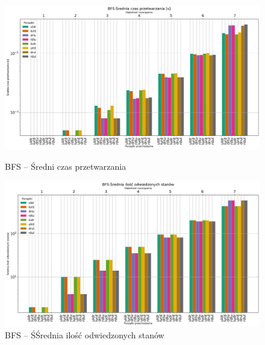 \documentclass{classrep}
\begin{document}
\begin{figure}[H]
    \includegraphics[width=\textwidth]{charts/BFS_time.png}
    \caption{BFS -- Średni czas przetwarzania}
    \label{BFS:time}
    \includegraphics[width=\textwidth]{charts/BFS_visited.png}
    \caption{BFS -- ŚŚrednia ilość odwiedzonych stanów}
    \label{BFS:time}
\end{figure}
\end{document}
